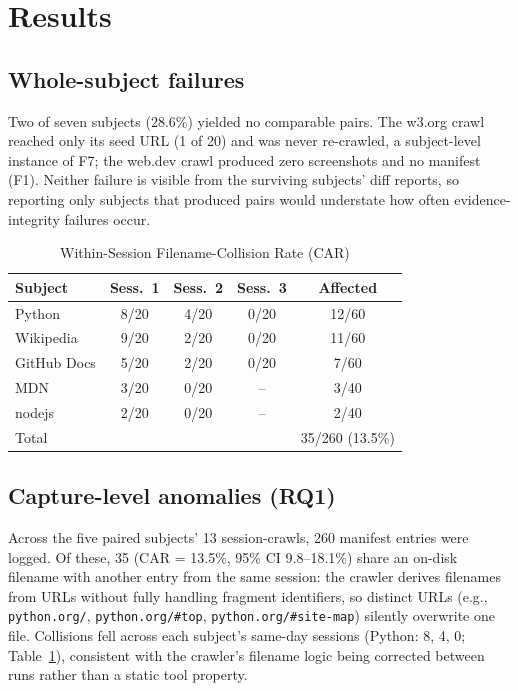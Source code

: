 \documentclass[conference]{IEEEtran}
\begin{document}
\section{Results}
\subsection{Whole-subject failures}
Two of seven subjects (28.6\%) yielded no comparable pairs. The w3.org crawl reached only its seed URL (1 of 20) and was never re-crawled, a subject-level instance of F7; the web.dev crawl produced zero screenshots and no manifest (F1). Neither failure is visible from the surviving subjects' diff reports, so reporting only subjects that produced pairs would understate how often evidence-integrity failures occur.

\begin{table}[!t]
\caption{Within-Session Filename-Collision Rate (CAR)}
\label{tab:car}
\centering\footnotesize
\begin{tabular}{@{}lcccc@{}}
\toprule
Subject & Sess.~1 & Sess.~2 & Sess.~3 & Affected\\
\midrule
Python & 8/20 & 4/20 & 0/20 & 12/60\\
Wikipedia & 9/20 & 2/20 & 0/20 & 11/60\\
GitHub Docs & 5/20 & 2/20 & 0/20 & 7/60\\
MDN & 3/20 & 0/20 & -- & 3/40\\
nodejs & 2/20 & 0/20 & -- & 2/40\\
\midrule
Total & \multicolumn{3}{c}{} & 35/260 (13.5\%)\\
\bottomrule
\end{tabular}
\end{table}

\subsection{Capture-level anomalies (RQ1)}
Across the five paired subjects' 13 session-crawls, 260 manifest entries were logged. Of these, 35 (CAR = 13.5\%, 95\% CI 9.8--18.1\%) share an on-disk filename with another entry from the same session: the crawler derives filenames from URLs without fully handling fragment identifiers, so distinct URLs (e.g., \texttt{python.org/}, \texttt{python.org/\#top}, \texttt{python.org/\#site-map}) silently overwrite one file. Collisions fell across each subject's same-day sessions (Python: 8, 4, 0; Table~\ref{tab:car}), consistent with the crawler's filename logic being corrected between runs rather than a static tool property.
\end{document}

